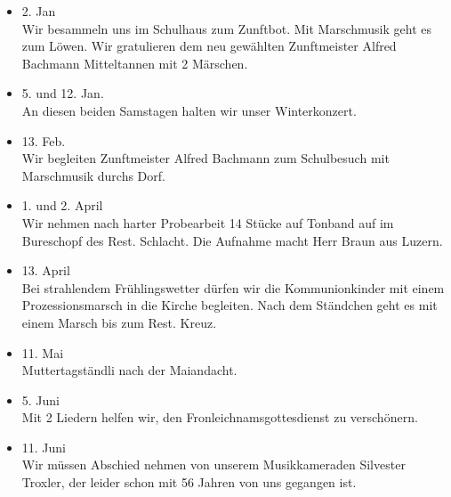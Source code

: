 \begin{multicols}{2}


    \begin{itemize}

        \item[]2. Jan\\
        Wir besammeln uns im Schulhaus zum Zunftbot. Mit Marschmusik geht es zum
        Löwen. Wir gratulieren dem neu gewählten Zunftmeister Alfred Bachmann
        Mitteltannen mit 2 Märschen.

        \item[]5. und 12. Jan.\\
        An diesen beiden Samstagen halten wir unser Winterkonzert.

        \item[]13. Feb.\\
        Wir begleiten Zunftmeister Alfred Bachmann zum Schulbesuch mit
        Marschmusik durchs Dorf.

        \item[]1. und 2. April\\
        Wir nehmen nach harter Probearbeit 14 Stücke auf Tonband auf im
        Bureschopf des Rest. Schlacht. Die Aufnahme macht Herr Braun aus Luzern.

        \item[]13. April\\
        Bei strahlendem Frühlingswetter dürfen wir die Kommunionkinder mit einem
        Prozessionsmarsch in die Kirche begleiten. Nach dem Ständchen geht es
        mit einem Marsch bis zum Rest. Kreuz.

        \item[]11. Mai\\
        Muttertagständli nach der Maiandacht.

        \item[]5. Juni\\
        Mit 2 Liedern helfen wir, den Fronleichnamsgottesdienst zu verschönern.

        \item[]11. Juni\\
        Wir müssen Abschied nehmen von unserem Musikkameraden Silvester Troxler,
        der leider schon mit 56 Jahren von uns gegangen ist.


\end{itemize}
\end{multicols}
